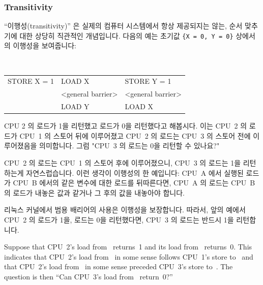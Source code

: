 \begin{enumerate}
\subsubsection{Transitivity}
\label{sec:advsync:Transitivity}

``이행성(transitivity)'' 은 실제의 컴퓨터 시스템에서 항상 제공되지는 않는, 순서
맞추기에 대한 상당히 직관적인 개념입니다.  다음의 예는 초기값
{\tt \{X~=~0, Y~=~0\}} 상에서의 이행성을 보여줍니다:

\vspace{5pt}
\begin{minipage}[t]{\columnwidth}
\tt
\scriptsize
\begin{tabular}{l|l|l}
	\nf{CPU 1}	& \nf{CPU 2}		& \nf{CPU 3} \\
	\hline
	STORE X = 1	& LOAD X		& STORE Y = 1 \\
			& <general barrier>	& <general barrier> \\
			& LOAD Y		& LOAD X \\
\end{tabular}
\end{minipage}
\vspace{5pt}

CPU 2 의  로드가 1을 리턴했고  로드가 0을 리턴했다고 해봅시다.
이는 CPU~2 의
 로드가 CPU~1 의  스토어 뒤에 이루어졌고 CPU~2 의  로드는
CPU~3 의  스토어 전에 이루어졌음을 의미합니다.
그럼 "CPU~3 의  로드는 0을 리턴할 수 있나요?"

CPU~2 의  로드는 CPU~1 의 스토어 후에 이루어졌으니, CPU~3 의 
로드는 1을 리턴하는게 자연스럽습니다.  이런 생각이 이행성의 한 예입니다: CPU~A
에서 실행된 로드가 CPU~B 에서의 같은 변수에 대한 로드를 뒤따른다면, CPU~A 의
로드는 CPU~B 의 로드가 내놓은 값과 같거나 그 후의 값을 내놓아야 합니다.

리눅스 커널에서 범용 배리어의 사용은 이행성을 보장합니다.  따라서, 앞의 예에서
CPU~2 의  로드가 1을,  로드는 0을 리턴했다면, CPU~3 의 
로드는 반드시 1을 리턴합니다.
\iffalse

Suppose that CPU~2's load from~ returns~1 and its load from~ returns~0.
This indicates that CPU~2's load from~ in some sense follows CPU~1's
store to~ and that CPU~2's load from~ in some sense preceded CPU~3's
store to~.  The question is then ``Can CPU~3's load from~ return~0?''


\end{enumerate}
